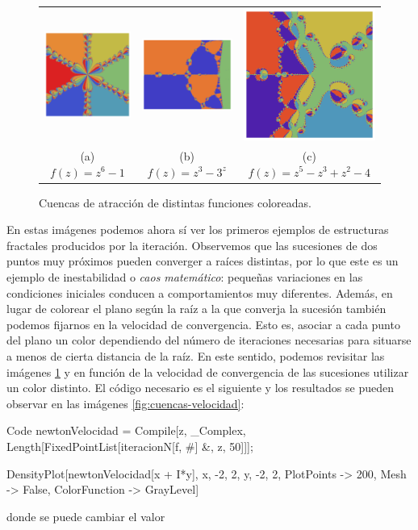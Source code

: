 \begin{figure}[ht]
    \centering
    \begin{tabular}{ccc}
      \includegraphics[scale=0.33]{img/cuencas-color-1.png} &   \includegraphics[scale=0.31]{img/cuencas-color-2.png} &   \includegraphics[scale=0.33]{img/cuencas-color-3.png} \\
    (a) $f(z)=z^6-1$ & (b) $f(z)=z^3-3^z$ & (c) $f(z)=z^5-z^3+z^2-4$ \\[6pt]
    \end{tabular}
    \caption{Cuencas de atracción de distintas funciones coloreadas.}
    \label{fig:cuencas-raiz}
\end{figure}

En estas imágenes podemos ahora sí ver los primeros ejemplos de estructuras fractales producidos por la iteración. Observemos que las sucesiones de dos puntos muy próximos pueden converger a raíces distintas, por lo que este es un ejemplo de inestabilidad o \textit{caos matemático}: pequeñas variaciones en las condiciones iniciales conducen a comportamientos muy diferentes. Además, en lugar de colorear el plano según la raíz a la que converja la sucesión también podemos fijarnos en la velocidad de convergencia. Esto es, asociar a cada punto del plano un color dependiendo del número de iteraciones necesarias para situarse a menos de cierta distancia de la raíz. En este sentido, podemos revisitar las imágenes \ref{fig:cuencas-raiz} y en función de la velocidad de convergencia de las sucesiones utilizar un color distinto. El código necesario es el siguiente y los resultados se pueden observar en las imágenes \ref{fig:cuencas-velocidad}:

\begin{mmaCell}{Code}
  newtonVelocidad = Compile[{{z, _Complex}}, 
    Length[FixedPointList[iteracionN[f, #] &, z, 50]]];
    
  DensityPlot[newtonVelocidad[x + I*y], {x, -2, 2}, {y, -2, 2}, 
    PlotPoints -> 200, Mesh -> False, ColorFunction -> GrayLevel]
\end{mmaCell}
donde se puede cambiar el valor